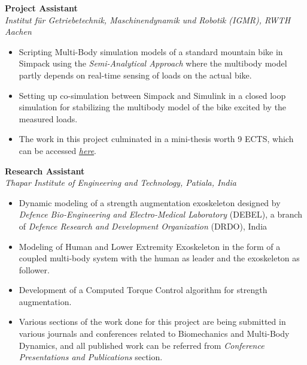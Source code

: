 \vspace{0.1 in}

\large{\textbf{Project Assistant}}
\hfill
\minithesisdate\\
\emph{\large{Institut für Getriebetechnik, Maschinendynamik und Robotik (IGMR), RWTH Aachen}}
\begin{itemize}
\item \large{Scripting Multi-Body simulation models of a standard mountain bike in Simpack using the \emph{Semi-Analytical Approach} where the multibody model partly depends on real-time sensing of loads on the actual bike.}
\item\large{Setting up co-simulation between Simpack and Simulink in a closed loop simulation for stabilizing the multibody model of the bike excited by the measured loads.}
\item\large{The work in this project culminated in a mini-thesis worth 9 ECTS, which can be accessed \href{https://github.com/average-engineer/MiniThesis_IGMR/blob/master/Thesis.pdf}{\large{\textit{here}}}.}
\end{itemize}

\vspace{0.1 in}

\large{\textbf{Research Assistant}}
\hfill
\drdodate\\
\emph{\large{Thapar Institute of Engineering and Technology, Patiala, India}}
\begin{itemize}
\item \large{Dynamic modeling of a strength augmentation exoskeleton designed by \emph{Defence Bio-Engineering and Electro-Medical Laboratory} (DEBEL), a branch of \emph{Defence Research and Development Organization} (DRDO), India}
\item\large{Modeling of Human and Lower Extremity Exoskeleton in the form of a coupled multi-body system with the human as leader and the exoskeleton as follower.}
\item\large{Development of a Computed Torque Control algorithm for strength augmentation.}
\item\large{Various sections of the work done for this project are being submitted in various journals and conferences related to Biomechanics and Multi-Body Dynamics, and all published work can be referred from \emph{Conference Presentations and Publications} section.}
\end{itemize}

